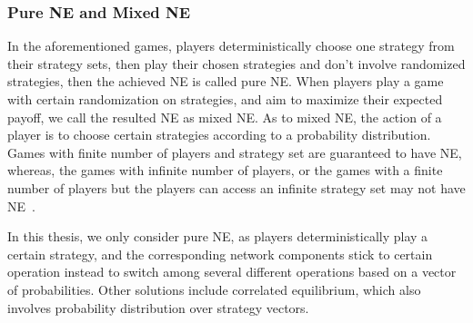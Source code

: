 




\subsubsection{Pure NE and Mixed NE}
In the aforementioned games, players deterministically choose one strategy from their strategy sets, then play their chosen strategies and don't involve randomized strategies, then the achieved NE is called pure NE. 
When players play a game with certain randomization on strategies, and aim to maximize their expected payoff, we call the resulted NE as mixed NE.
As to mixed NE, the action of a player is to choose certain strategies according to a probability distribution.
Games with finite number of players and strategy set are guaranteed to have NE, whereas, the games with infinite number of players, or the games with a finite number of players but the players can access an infinite strategy set may not have NE~\cite{agt_book}.

In this thesis, we only consider pure NE, as players deterministically play a certain strategy, and the corresponding network components stick to certain operation instead to switch among several different operations based on a vector of probabilities.
Other solutions include correlated equilibrium, which also involves probability distribution over strategy vectors.




